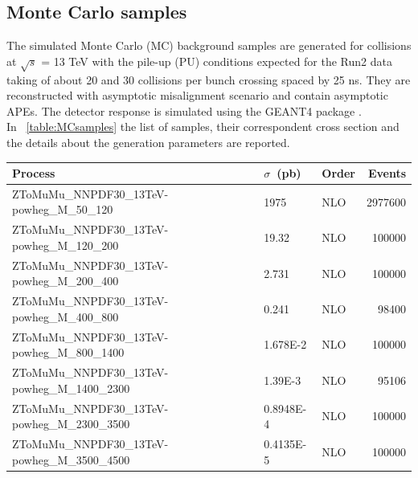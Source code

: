 \subsection{Monte Carlo samples}
The simulated Monte Carlo (MC) background samples are generated for collisions at $\sqrt{s}$ = 13 TeV with the pile-up (PU) conditions expected for the Run2 data taking of about 20 and 30 collisions per bunch crossing spaced by 25 ns. They are reconstructed with asymptotic misalignment scenario and contain asymptotic APEs. The detector response is simulated using the GEANT4 package \cite{GEANT4}.\\
In \tablename~\ref{table:MCsamples} the list of samples, their correspondent cross section and the details about the generation parameters are reported. \\
\begin{table}[htbp!]
{\footnotesize
\begin{tabular}{|l|l|l|r|}
\hline
Process                                                                                 & $\sigma$~(pb) & Order & Events \\ 
\hline\hline                                                                                                       
ZToMuMu\_NNPDF30\_13TeV-powheg\_M\_50\_120						&  1975      & NLO  &   2977600 \\ %
ZToMuMu\_NNPDF30\_13TeV-powheg\_M\_120\_200                                               &  19.32     & NLO  &    100000 \\ %
ZToMuMu\_NNPDF30\_13TeV-powheg\_M\_200\_400                                               &  2.731     & NLO  &    100000 \\ %
ZToMuMu\_NNPDF30\_13TeV-powheg\_M\_400\_800                                               &  0.241     & NLO  &     98400 \\ %
ZToMuMu\_NNPDF30\_13TeV-powheg\_M\_800\_1400                                              &  1.678E-2  & NLO  &    100000 \\ %
ZToMuMu\_NNPDF30\_13TeV-powheg\_M\_1400\_2300                                             &  1.39E-3   & NLO  &     95106 \\ %
ZToMuMu\_NNPDF30\_13TeV-powheg\_M\_2300\_3500                                             &  0.8948E-4 & NLO  &    100000 \\ %
ZToMuMu\_NNPDF30\_13TeV-powheg\_M\_3500\_4500                                             &  0.4135E-5 & NLO  &    100000 \\ %

\end{tabular}}
\end{table}
